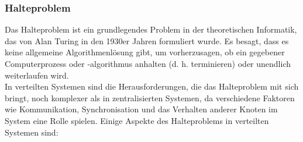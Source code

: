 \documentclass[../vs-script-first-v01.tex]{subfiles}
\begin{document}
\subsubsection{Halteproblem}

Das Halteproblem ist ein grundlegendes Problem in der theoretischen Informatik, das von Alan Turing in den 1930er Jahren formuliert wurde. Es besagt, dass es keine allgemeine Algorithmenlösung gibt, um vorherzusagen, ob ein gegebener Computerprozess oder -algorithmus anhalten (d. h. terminieren) oder unendlich weiterlaufen wird.\\

In verteilten Systemen sind die Herausforderungen, die das Halteproblem mit sich bringt, noch komplexer als in zentralisierten Systemen, da verschiedene Faktoren wie Kommunikation, Synchronisation und das Verhalten anderer Knoten im System eine Rolle spielen. Einige Aspekte des Halteproblems in verteilten Systemen sind:
\end{document}
